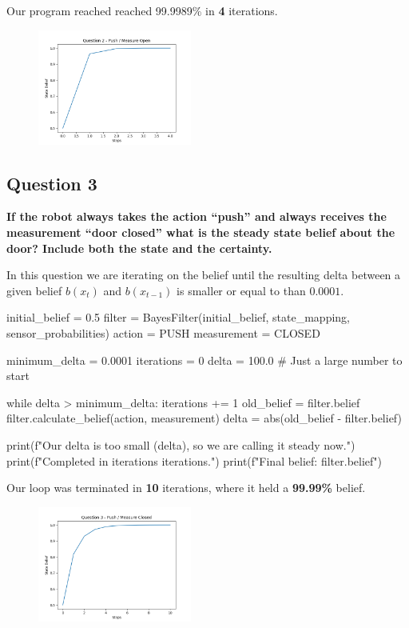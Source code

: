 \documentclass{article}
\begin{document}
Our program reached reached 99.9989\% in \textbf{4} iterations.

\begin{figure}[H]
    \centering
    \includegraphics[width = 0.45\textwidth]{q2.png}
\end{figure}

\subsection*{Question 3}
\textbf{If the robot always takes the action “push” and always receives the measurement “door closed” what is the steady state belief about the door? Include both the state and the certainty.}

In this question we are iterating on the belief until the resulting delta between a given belief $b(x_t)$ and $b(x_{t-1})$ is smaller or equal to than $0.0001$.

\begin{python}
    initial_belief = 0.5
    filter = BayesFilter(initial_belief, state_mapping, sensor_probabilities)
    action = PUSH
    measurement = CLOSED

    minimum_delta = 0.0001
    iterations = 0
    delta = 100.0  # Just a large number to start

    while delta > minimum_delta:
    iterations += 1
    old_belief = filter.belief
    filter.calculate_belief(action, measurement)
    delta = abs(old_belief - filter.belief)

    print(f"Our delta is too small ({delta}), so we are calling it steady now.")
    print(f"Completed in {iterations} iterations.")
    print(f"Final belief: {filter.belief}")
\end{python}

Our loop was terminated in \textbf{10} iterations, where it held a \textbf{99.99\%} belief.

\begin{figure}[H]
    \centering
    \includegraphics[width = 0.45\textwidth]{q3.png}
\end{figure}
\end{document}
